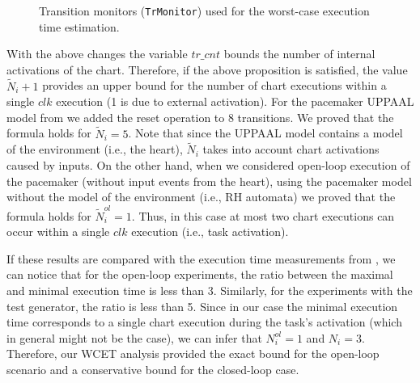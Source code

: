 \begin{figure}[!t]
\centering
\caption{Transition monitors (\texttt{TrMonitor}) used for the worst-case execution time estimation.}
\label{fig:TrMon}
\end{figure} 


With the above changes the variable $tr\_cnt$ bounds the number of internal activations of the chart. 
Therefore, if the above proposition is satisfied, the value $\tilde{N}_i+1$ provides an upper bound for the number of chart executions within a single $clk$ execution (1 is due to external activation). For the pacemaker UPPAAL model from  we added the reset operation to 8 transitions. We proved that the formula holds for $\tilde{N}_i=5$. 
Note that since the UPPAAL model contains a model of the environment (i.e., the heart), $\tilde{N}_i$ takes into account chart activations caused by inputs. On the other hand, when we considered open-loop execution of the pacemaker (without input events from the heart), using the pacemaker model   without the model of the environment (i.e., RH automata) we proved that the formula holds for $\tilde{N}_i^{ol}=1$. Thus, in this case at most two chart executions can occur within a single $clk$ execution (i.e., task activation).

If these results are compared with the execution time measurements from , we can notice that for the open-loop experiments, the ratio between the maximal and minimal execution time is less than 3. Similarly, for the experiments with the test generator, the ratio is less than 5. Since in our case the minimal execution time corresponds to a single chart execution during the task's  activation (which in general might not be the case), we can infer that $N_i^{ol}=1$ and $N_i=3$. Therefore, our WCET analysis provided the exact bound for the open-loop scenario and a conservative bound for the closed-loop case.

